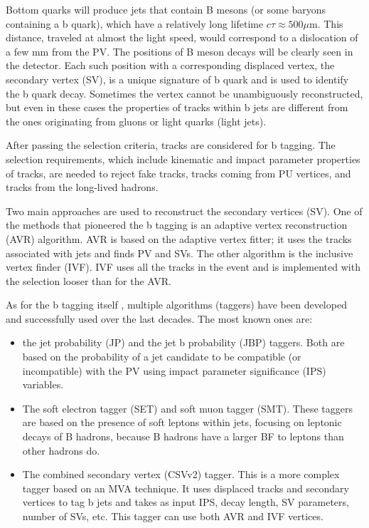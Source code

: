 Bottom quarks will produce jets that contain B mesons (or some baryons containing a b quark), which have a relatively long lifetime $c \tau \approx 500 \mu$m. This distance, traveled at almost the light speed, would correspond to a dislocation of a few mm from the PV. The positions of B meson decays will be clearly seen in the detector. Each such position with a corresponding displaced vertex, the secondary vertex (SV), is a unique signature of b quark and is used to identify the b quark decay. Sometimes the vertex cannot be unambiguously reconstructed, but even in these cases the properties of tracks within b jets are different from the ones originating from gluons or light quarks (light jets).

After passing the selection criteria, tracks are considered for b tagging. The selection requirements, which include kinematic and impact parameter properties of tracks, are needed to reject fake tracks, tracks coming from PU vertices, and tracks from the long-lived hadrons. 

Two main approaches are used to reconstruct the secondary vertices (SV). One of the methods that pioneered the b tagging is an adaptive vertex reconstruction (AVR) algorithm. AVR is based on the adaptive vertex fitter; it uses the tracks associated with jets and finds PV and SVs. The other algorithm is the inclusive vertex finder (IVF). IVF uses all the tracks in the event and is implemented with the selection looser than for the AVR. 

As for the b tagging itself \cite{CMS-PAS-BTV-15-001, Sirunyan:2017ezt}, multiple algorithms (taggers) have been developed and successfully used over the last decades. The most known ones are: 

\begin{itemize}
\item the jet probability (JP) and the jet b probability (JBP) taggers. Both are based on the probability of a jet candidate to be compatible (or incompatible) with the PV using impact parameter significance (IPS) variables.
\item The soft electron tagger (SET) and soft muon tagger (SMT). These taggers are based on the presence of soft leptons within jets, focusing on leptonic decays of B hadrons, because B hadrons have a larger BF to leptons than other hadrons do.
\item The combined secondary vertex (CSVv2) tagger. This is a more complex tagger based on an MVA technique. It uses displaced tracks and secondary vertices to tag b jets and takes as input IPS, decay length, SV parameters, number of SVs, etc. This tagger can use both AVR and IVF vertices.
\end{itemize}

